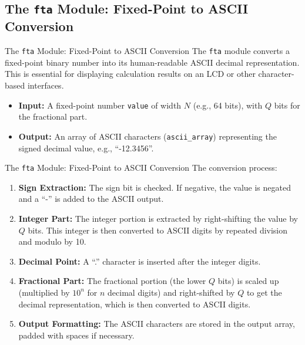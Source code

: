 \documentclass{beamer}
\theoremstyle{remark}
\begin{document}
\subsection{The \texttt{fta} Module: Fixed-Point to ASCII Conversion}
\begin{frame}{The \texttt{fta} Module: Fixed-Point to ASCII Conversion}
The \texttt{fta} module converts a fixed-point binary number into its human-readable ASCII decimal representation. This is essential for displaying calculation results on an LCD or other character-based interfaces.

\begin{itemize}
    \item \textbf{Input:} A fixed-point number \texttt{value} of width $N$ (e.g., 64 bits), with $Q$ bits for the fractional part.
    \item \textbf{Output:} An array of ASCII characters (\texttt{ascii\_array}) representing the signed decimal value, e.g., ``-12.3456''.
\end{itemize}
\end{frame}

\begin{frame}{The \texttt{fta} Module: Fixed-Point to ASCII Conversion}
    The conversion process:
\begin{enumerate}
    \item \textbf{Sign Extraction:} The sign bit is checked. If negative, the value is negated and a ``-'' is added to the ASCII output.
    \item \textbf{Integer Part:} The integer portion is extracted by right-shifting the value by $Q$ bits. This integer is then converted to ASCII digits by repeated division and modulo by 10.
    \item \textbf{Decimal Point:} A ``.'' character is inserted after the integer digits.
    \item \textbf{Fractional Part:} The fractional portion (the lower $Q$ bits) is scaled up (multiplied by $10^n$ for $n$ decimal digits) and right-shifted by $Q$ to get the decimal representation, which is then converted to ASCII digits.
    \item \textbf{Output Formatting:} The ASCII characters are stored in the output array, padded with spaces if necessary.
\end{enumerate}
\end{frame}
\end{document}
